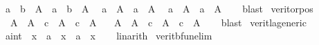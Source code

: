 \begin{isabellebody}
\ \ {\isacartoucheopen}{\isacharparenleft}{\kern0pt}a\ {\isasymLongrightarrow}\ b\ {\isasymLongrightarrow}\ A{\isacharparenright}{\kern0pt}\ {\isasymLongrightarrow}\ {\isasymnot}{\isacharparenleft}{\kern0pt}a\ {\isasymand}\ b{\isacharparenright}{\kern0pt}\ {\isasymor}\ A{\isacartoucheclose}\isanewline
\ \ {\isacartoucheopen}{\isacharparenleft}{\kern0pt}a\ {\isasymLongrightarrow}\ A{\isacharparenright}{\kern0pt}\ {\isasymLongrightarrow}\ {\isasymnot}a\ {\isasymor}\ A{\isacartoucheclose}\isanewline
\ \ {\isacartoucheopen}{\isacharparenleft}{\kern0pt}{\isasymnot}a\ {\isasymLongrightarrow}\ A{\isacharparenright}{\kern0pt}\ {\isasymLongrightarrow}\ a\ {\isasymor}\ A{\isacartoucheclose}\isanewline
%
\isadelimproof
\ \ %
\endisadelimproof
%
\isatagproof
{}\isamarkupfalse%
\ blast{\isacharplus}{\kern0pt}%
\endisatagproof
{\isafoldproof}%
%
\isadelimproof
\isanewline
%
\endisadelimproof
\isanewline
{}\isamarkupfalse%
\ verit{\isacharunderscore}{\kern0pt}or{\isacharunderscore}{\kern0pt}pos{\isacharcolon}{\kern0pt}\isanewline
\ \ \ {\isacartoucheopen}A\ {\isasymand}\ A{\isacharprime}{\kern0pt}\ {\isasymLongrightarrow}\ {\isacharparenleft}{\kern0pt}c\ {\isasymand}\ A{\isacharparenright}{\kern0pt}\ {\isasymor}\ {\isacharparenleft}{\kern0pt}{\isasymnot}c\ {\isasymand}\ A{\isacharprime}{\kern0pt}{\isacharparenright}{\kern0pt}{\isacartoucheclose}\isanewline
\ \ \ {\isacartoucheopen}A\ {\isasymand}\ A{\isacharprime}{\kern0pt}\ {\isasymLongrightarrow}\ {\isacharparenleft}{\kern0pt}{\isasymnot}c\ {\isasymand}\ A{\isacharparenright}{\kern0pt}\ {\isasymor}\ {\isacharparenleft}{\kern0pt}c\ {\isasymand}\ A{\isacharprime}{\kern0pt}{\isacharparenright}{\kern0pt}{\isacartoucheclose}\isanewline
%
\isadelimproof
\ \ %
\endisadelimproof
%
\isatagproof
{}\isamarkupfalse%
\ blast{\isacharplus}{\kern0pt}%
\endisatagproof
{\isafoldproof}%
%
\isadelimproof
\isanewline
%
\endisadelimproof
\isanewline
\isanewline
{}\isamarkupfalse%
\ verit{\isacharunderscore}{\kern0pt}la{\isacharunderscore}{\kern0pt}generic{\isacharcolon}{\kern0pt}\isanewline
\ \ {\isacartoucheopen}{\isacharparenleft}{\kern0pt}a{\isacharcolon}{\kern0pt}{\isacharcolon}{\kern0pt}int{\isacharparenright}{\kern0pt}\ {\isasymle}\ x\ {\isasymor}\ a\ {\isacharequal}{\kern0pt}\ x\ {\isasymor}\ a\ {\isasymge}\ x{\isacartoucheclose}\isanewline
%
\isadelimproof
\ \ %
\endisadelimproof
%
\isatagproof
{}\isamarkupfalse%
\ linarith%
\endisatagproof
{\isafoldproof}%
%
\isadelimproof
\isanewline
%
\endisadelimproof
\isanewline
{}\isamarkupfalse%
\ verit{\isacharunderscore}{\kern0pt}bfun{\isacharunderscore}{\kern0pt}elim{\isacharcolon}{\kern0pt}\isanewline

\end{isabellebody}
